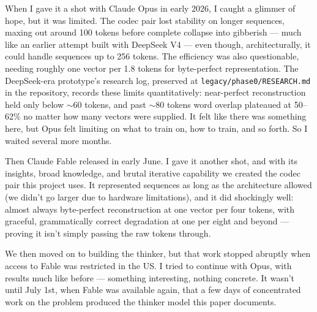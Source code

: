 \documentclass[11pt]{article}
\begin{document}
When I gave it a shot with Claude Opus in early 2026, I caught a glimmer of
hope, but it was limited. The codec pair lost stability on longer sequences,
maxing out around 100 tokens before complete collapse into gibberish --- much
like an earlier attempt built with DeepSeek V4 --- even though,
architecturally, it could handle sequences up to 256 tokens. The efficiency
was also questionable, needing roughly one vector per 1.8 tokens for
byte-perfect representation. The DeepSeek-era prototype's research log,
preserved at \texttt{legacy/phase0/RESEARCH.md} in the repository, records
these limits quantitatively: near-perfect reconstruction held only below
$\sim$60 tokens, and past $\sim$80 tokens word overlap plateaued at 50--62\%
no matter how many vectors were supplied. It felt like there was something
here, but Opus felt limiting on what to train on, how to train, and so
forth. So I waited several more months.

Then Claude Fable released in early June. I gave it another shot, and with
its insights, broad knowledge, and brutal iterative capability we created the
codec pair this project uses. It represented sequences as long as the
architecture allowed (we didn't go larger due to hardware limitations), and
it did shockingly well: almost always byte-perfect reconstruction at one vector per
four tokens, with graceful, grammatically correct degradation at one per
eight and beyond --- proving it isn't simply passing the raw tokens through.

We then moved on to building the thinker, but that work stopped abruptly
when access to Fable was restricted in the US. I tried to continue with
Opus, with results much like before --- something interesting, nothing
concrete. It wasn't until July 1st, when Fable was available again, that a
few days of concentrated work on the problem produced the thinker model this
paper documents.
\end{document}
